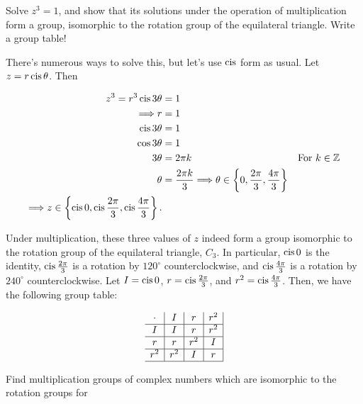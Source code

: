 \documentclass[../key.tex]{subfiles}
\begin{document}
\begin{outer_problem}
\item Solve $z^3 = 1$, and show that its solutions under the operation of multiplication form a group, isomorphic to the rotation group of the equilateral triangle. Write a group table!
\end{outer_problem}

There's numerous ways to solve this, but let's use $\operatorname{cis}$ form as usual. Let $z=r\operatorname{cis}\theta$. Then

\begin{align*}
z^3 = r^3\operatorname{cis} 3\theta &= 1 \\
\Longrightarrow r &= 1 \\
\operatorname{cis} 3\theta &= 1 \\
\cos 3\theta &= 1 \\
3\theta &= 2\pi k & \text{For } k\in\mathbb{Z} \\
\theta &= \frac{2\pi k}{3}
\Longrightarrow \theta \in \left\{0,\frac{2\pi}{3},\frac{4\pi}{3}\right\} \\
\Longrightarrow z \in \left\{\operatorname{cis} 0,\operatorname{cis} \frac{2\pi}{3},\operatorname{cis} \frac{4\pi}{3}\right\}.
\end{align*}

Under multiplication, these three values of $z$ indeed form a group isomorphic to the rotation group of the equilateral triangle, $C_3$. In particular, $\operatorname{cis} 0$ is the identity, $\operatorname{cis} \frac{2\pi}{3}$ is a rotation by $120^\circ$ counterclockwise, and $\operatorname{cis} \frac{4\pi}{3}$ is a rotation by $240^\circ$ counterclockwise. Let $I=\operatorname{cis} 0$, $r=\operatorname{cis}\frac{2\pi}{3}$, and $r^2=\operatorname{cis} \frac{4\pi}{3}$. Then, we have the following group table:

$$\begin{array}{c|c|c|c|}
\cdot & I & r & r^2 \\ \hline
I & I & r & r^2 \\ \hline
r & r & r^2 & I \\ \hline
r^2 & r^2 & I & r \\ \hline
\end{array}$$

\begin{outer_problem}
\item
\end{outer_problem}

\begin{inner_problem}[start=1]
\item Find multiplication groups of complex numbers which are isomorphic to the rotation groups for
\end{inner_problem}
\end{document}
